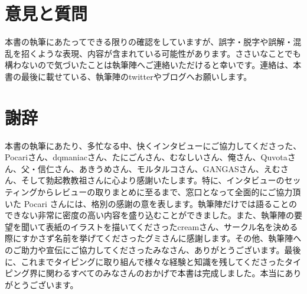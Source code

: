 \part*{意見と質問}
本書の執筆にあたってできる限りの確認をしていますが、誤字・脱字や誤解・混乱を招くような表現、内容が含まれている可能性があります。ささいなことでも構わないので気づいたことは執筆陣へご連絡いただけると幸いです。連絡は、本書の最後に載せている、執筆陣のtwitterやブログへお願いします。

\part*{謝辞}
本書の執筆にあたり、多忙なる中、快くインタビューにご協力してくださった、Pocariさん、dqmaniacさん、たにごんさん、むなしいさん、俺さん、Quvotaさん、父・信仁さん、あきうめさん、モルタルコさん、GANGASさん、えむさん、そして勃起教教祖さんに心より感謝いたします。特に、インタビューのセッティングからレビューの取りまとめに至るまで、窓口となって全面的にご協力頂いた Pocari さんには、格別の感謝の意を表します。執筆陣だけでは語ることのできない非常に密度の高い内容を盛り込むことができました。また、執筆陣の要望を聞いて表紙のイラストを描いてくださったcreamさん、サークル名を決める際にすかさず名前を挙げてくださったグミさんに感謝します。その他、執筆陣へのご助力や宣伝にご協力してくださったみなさん、ありがとうございます。最後に、これまでタイピングに取り組んで様々な経験と知識を残してくださったタイピング界に関わるすべてのみなさんのおかげで本書は完成しました。本当にありがとうございます。

